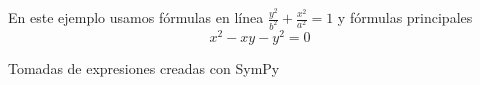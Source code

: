 \documentclass[preview]{standalone}
\begin{document}
\begin{center}
En este ejemplo usamos fórmulas en línea $\frac{y^{2}}{b^{2}} + \frac{x^{2}}{a^{2}} = 1$ y fórmulas principales 
$$x^{2} - x y - y^{2} = 0$$ 

Tomadas de expresiones creadas con SymPy
\end{center}
\end{document}
